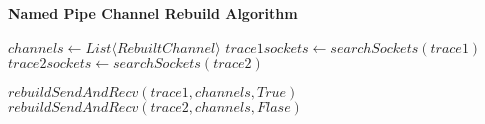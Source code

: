 \begin{algorithm}[H]
\DontPrintSemicolon
\caption{{\bf Named Pipe Channel Rebuild Algorithm} \label{TCPAlogrithm}}
 $channels \leftarrow List\langle RebuiltChannel\rangle $\; 
 $trace1sockets \leftarrow searchSockets\left( trace1 \right)  $\;
 $trace2sockets \leftarrow searchSockets\left( trace2 \right)  $\;



 $rebuildSendAndRecv \left( trace1,channels,True \right) $\;
 $rebuildSendAndRecv \left( trace2,channels,Flase \right) $\;
\end{algorithm} 
  
